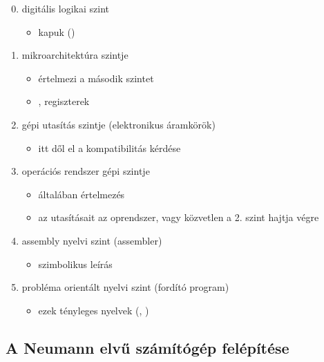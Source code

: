 \documentclass[../main.tex]{subfiles}
\begin{document}
\begin{enumerate}
  \setcounter{enumi}{-1}
  \item digitális logikai szint
        \begin{itemize}
          \item kapuk ()
        \end{itemize}

  \item mikroarchitektúra  szintje
        \begin{itemize}
          \item értelmezi a második szintet
          \item {}, regiszterek
        \end{itemize}

  \item gépi utasítás szintje (elektronikus áramkörök)
        \begin{itemize}
          \item itt dől el a kompatibilitás kérdése
        \end{itemize}

  \item operációs rendszer gépi szintje
        \begin{itemize}
          \item általában értelmezés
          \item az utasításait az oprendszer,
                vagy közvetlen a 2. szint hajtja végre
        \end{itemize}

  \item assembly nyelvi szint (assembler)
        \begin{itemize}
          \item szimbolikus leírás
        \end{itemize}

  \item probléma orientált nyelvi szint (fordító program)
        \begin{itemize}
          \item ezek tényleges nyelvek (, )
        \end{itemize}
\end{enumerate}

\subsection*{A Neumann elvű számítógép felépítése}
\end{document}
